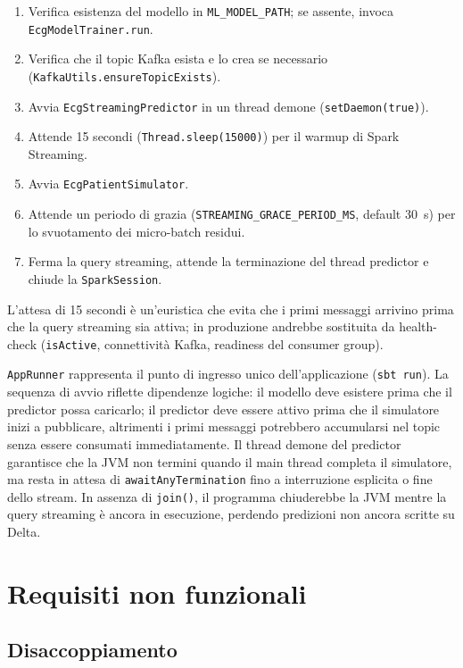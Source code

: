 \begin{enumerate}
  \item Verifica esistenza del modello in \texttt{ML\_MODEL\_PATH}; se assente, invoca \texttt{EcgModelTrainer.run}.
  \item Verifica che il topic Kafka esista e lo crea se necessario (\texttt{KafkaUtils.ensureTopicExists}).
  \item Avvia \texttt{EcgStreamingPredictor} in un thread demone (\texttt{setDaemon(true)}).
  \item Attende 15 secondi (\texttt{Thread.sleep(15000)}) per il warmup di Spark Streaming.
  \item Avvia \texttt{EcgPatientSimulator}.
  \item Attende un periodo di grazia (\texttt{STREAMING\_GRACE\_PERIOD\_MS}, default 30~s) per lo svuotamento dei micro-batch residui.
  \item Ferma la query streaming, attende la terminazione del thread predictor e chiude la \texttt{SparkSession}.
\end{enumerate}

L'attesa di 15 secondi è un'euristica che evita che i primi messaggi arrivino prima che la query streaming sia attiva; in produzione andrebbe sostituita da health-check (\texttt{isActive}, connettività Kafka, readiness del consumer group).

\texttt{AppRunner} rappresenta il punto di ingresso unico dell'applicazione (\texttt{sbt run}).
La sequenza di avvio riflette dipendenze logiche: il modello deve esistere prima che il predictor possa caricarlo; il predictor deve essere attivo prima che il simulatore inizi a pubblicare, altrimenti i primi messaggi potrebbero accumularsi nel topic senza essere consumati immediatamente.
Il thread demone del predictor garantisce che la JVM non termini quando il main thread completa il simulatore, ma resta in attesa di \texttt{awaitAnyTermination} fino a interruzione esplicita o fine dello stream.
In assenza di \texttt{join()}, il programma chiuderebbe la JVM mentre la query streaming è ancora in esecuzione, perdendo predizioni non ancora scritte su Delta.

\section{Requisiti non funzionali}\label{sec:requisiti-nf}

\subsection{Disaccoppiamento}

